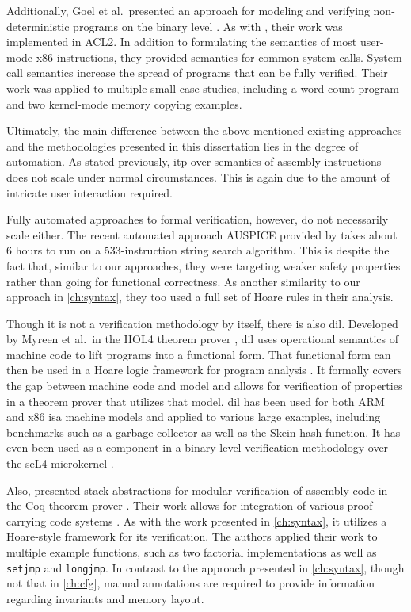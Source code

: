 Additionally, Goel et al.\ presented an approach for modeling and verifying
non-deterministic programs on the binary level \autocite{goel2014syscalls,goelphd}.
As with \textcite{matthews2006verification}, their work was implemented in ACL2.
In addition to formulating the semantics of most user-mode x86 instructions,
they provided semantics for common system calls.
System call semantics increase the spread of programs that can be fully verified.
Their work was applied to multiple small case studies,
including a word count program and two kernel-mode memory copying examples.

Ultimately, the main difference between the above-mentioned existing approaches
and the methodologies presented in this dissertation lies in the degree of automation.
As stated previously, \ac{itp} over semantics of assembly instructions
does not scale under normal circumstances.
This is again due to the amount of intricate user interaction required.

Fully automated approaches to formal verification, however,
do not necessarily scale either.
The recent automated approach AUSPICE provided by \textcite{tan2015auspice}
takes about 6 hours to run on a 533-instruction string search algorithm.
This is despite the fact that, similar to our approaches, %
they were targeting weaker safety properties
rather than going for functional correctness.
As another similarity to our approach in \cref{ch:syntax},
they too used a full set of Hoare rules in their analysis.

Though it is not a verification methodology by itself,
there is also \ac{dil}.
Developed by Myreen et al.\ in the HOL4 theorem prover \autocite{slind2008brief},
\ac{dil} uses operational semantics of machine code
to lift programs into a functional form.
That functional form can then be used in a Hoare logic framework
for program analysis \autocite{myreen2007hoare}.
It formally covers the gap between machine code and  model
and allows for verification of properties in a theorem prover that utilizes that model.
\Ac{dil} has been used for both ARM and x86 \ac{isa} machine models
and applied to various large examples,
including benchmarks such as a garbage collector as well as the Skein hash function.
It has even been used as a component in a binary-level verification methodology
over the seL4 microkernel \autocite{sewell2013tvv}.

Also, \textcite{feng2006modular,feng2005sbca} presented stack abstractions
for modular verification of assembly code
in the Coq theorem prover \autocite{chlipala2013certified}.
Their work allows for integration
of various proof-carrying code systems \autocite{necula1997proof}.
As with the work presented in \cref{ch:syntax},
it utilizes a Hoare-style framework for its verification.
The authors applied their work to multiple example functions,
such as two factorial implementations
as well as \lstinline|setjmp| and \lstinline|longjmp|.
In contrast to the approach presented in \cref{ch:syntax},
though not that in \cref{ch:cfg},
manual annotations are required to provide information
regarding invariants and memory layout.


